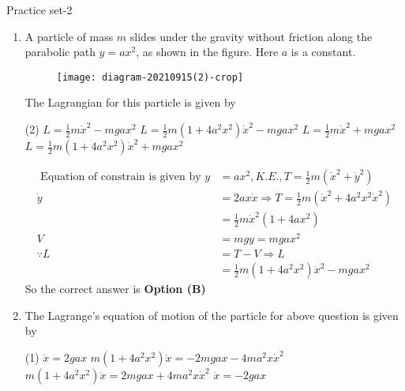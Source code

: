 \newpage
\begin{abox}
	Practice set-2
\end{abox}
\begin{enumerate}
	\item A particle of mass $m$ slides under the gravity without friction along the parabolic path $y=a x^{2}$, as shown in the figure. Here $a$ is a constant.\\
	\begin{figure}[H]
		\centering
		\texttt{[image: diagram-20210915(2)-crop]}
	\end{figure}
	The Lagrangian for this particle is given by
	{	}
	\begin{tasks}(2)
		\task[\textbf{A.}] $L=\frac{1}{2} m \dot{x}^{2}-m g a x^{2}$
		\task[\textbf{B.}] $L=\frac{1}{2} m\left(1+4 a^{2} x^{2}\right) \dot{x}^{2}-m g a x^{2}$
		\task[\textbf{C.}] $L=\frac{1}{2} m \dot{x}^{2}+m g a x^{2}$
		\task[\textbf{D.}] $L=\frac{1}{2} m\left(1+4 a^{2} x^{2}\right) \dot{x}^{2}+m g a x^{2}$
	\end{tasks}
\begin{answer}
	\begin{align*}
	\text{	Equation of constrain is given by }y&=a x^{2}, K.E., T=\frac{1}{2}m\left(\dot{x}^{2}+\dot{y}^{2}\right)\\
	\dot{y}&=2 a x \dot{x} \Rightarrow T=\frac{1}{2} m\left(\dot{x}^{2}+4 a^{2} x^{2} \dot{x}^{2}\right)\\&=\frac{1}{2} m \dot{x}^{2}\left(1+4 a x^{2}\right) \\
	V&=m g y=m g a x^{2}\\
	\because L&=T-V \Rightarrow L\\&=\frac{1}{2} m\left(1+4 a^{2} x^{2}\right) \dot{x}^{2}-m g a x^{2}
	\end{align*}
	So the correct answer is \textbf{Option (B)}
\end{answer}
	\item  The Lagrange's equation of motion of the particle for above question is given by
	{}
	\begin{tasks}(1)
		\task[\textbf{A.}] $\ddot{x}=2 g a x$
		\task[\textbf{B.}] $m\left(1+4 a^{2} x^{2}\right) \ddot{x}=-2 m g a x-4 m a^{2} x \dot{x}^{2}$
		\task[\textbf{C.}] $m\left(1+4 a^{2} x^{2}\right) \ddot{x}=2 m g a x+4 m a^{2} x \dot{x}^{2}$
		\task[\textbf{D.}] $\ddot{x}=-2 g a x$
	\end{tasks}
\begin{answer}
	\begin{align*}

\end{align*}
\end{answer}
\end{enumerate}
